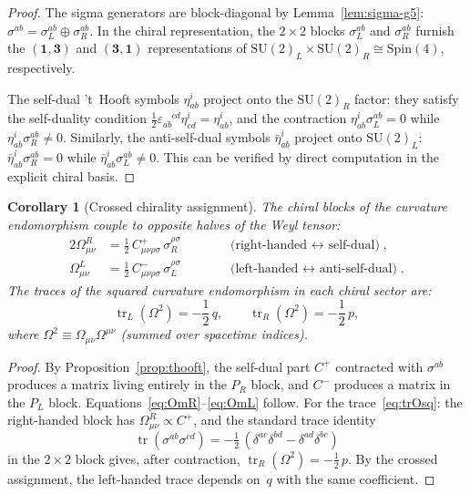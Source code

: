 \documentclass[12pt,a4paper]{article}
\newtheorem{corollary}[theorem]{Corollary}
\theoremstyle{definition}
\theoremstyle{remark}
\newcommand{\tr}{\operatorname{tr}}
\newcommand{\half}{\tfrac{1}{2}}
\begin{document}
\begin{proof}
The sigma generators are block-diagonal by Lemma~\ref{lem:sigma-g5}:
$\sigma^{ab} = \sigma^{ab}_L \oplus \sigma^{ab}_R$.  In the chiral
representation, the $2 \times 2$ blocks $\sigma^{ab}_L$ and $\sigma^{ab}_R$
furnish the $(\mathbf{1}, \mathbf{3})$ and $(\mathbf{3}, \mathbf{1})$
representations of $\mathrm{SU}(2)_L \times \mathrm{SU}(2)_R \cong
\mathrm{Spin}(4)$, respectively.

The self-dual 't~Hooft symbols $\eta^i_{ab}$ project onto the
$\mathrm{SU}(2)_R$ factor: they satisfy the self-duality condition
$\frac{1}{2}\varepsilon_{ab}^{\phantom{ab}cd}\eta^i_{cd} = \eta^i_{ab}$,
and the contraction $\eta^i_{ab}\sigma^{ab}_L = 0$ while
$\eta^i_{ab}\sigma^{ab}_R \neq 0$.  Similarly, the anti-self-dual
symbols $\bar\eta^i_{ab}$ project onto $\mathrm{SU}(2)_L$:
$\bar\eta^i_{ab}\sigma^{ab}_R = 0$ while
$\bar\eta^i_{ab}\sigma^{ab}_L \neq 0$.
This can be verified by direct computation in the explicit chiral basis.
\end{proof}

\begin{corollary}[Crossed chirality assignment]
\label{cor:crossed}
The chiral blocks of the curvature endomorphism couple to opposite halves
of the Weyl tensor:
\begin{alignat}{2}
  \Omega^R_{\mu\nu} &= \frac{1}{2}\,C^+_{\mu\nu\rho\sigma}\,
  \sigma^{\rho\sigma}_R
  &\qquad &\text{(right-handed $\leftrightarrow$ self-dual)},
  \label{eq:OmR} \\[4pt]
  \Omega^L_{\mu\nu} &= \frac{1}{2}\,C^-_{\mu\nu\rho\sigma}\,
  \sigma^{\rho\sigma}_L
  &\qquad &\text{(left-handed $\leftrightarrow$ anti-self-dual)}.
  \label{eq:OmL}
\end{alignat}
The traces of the squared curvature endomorphism in each chiral sector are:
\begin{equation}\label{eq:trOsq}
  \tr_L(\Omega^2) = -\frac{1}{2}\,q, \qquad
  \tr_R(\Omega^2) = -\frac{1}{2}\,p,
\end{equation}
where $\Omega^2 \equiv \Omega_{\mu\nu}\Omega^{\mu\nu}$ (summed over
spacetime indices).
\end{corollary}

\begin{proof}
By Proposition~\ref{prop:thooft}, the self-dual part $C^+$ contracted
with $\sigma^{ab}$ produces a matrix living entirely in the $P_R$ block,
and $C^-$ produces a matrix in the $P_L$ block.
Equations~\eqref{eq:OmR}--\eqref{eq:OmL} follow.  For the
trace~\eqref{eq:trOsq}: the right-handed block has
$\Omega^R_{\mu\nu} \propto C^+$, and the standard trace identity
\begin{equation}
  \tr(\sigma^{ab}\sigma^{cd})
  = -\half\,(\delta^{ac}\delta^{bd} - \delta^{ad}\delta^{bc})
\end{equation}
in the $2 \times 2$ block gives, after
contraction, $\tr_R(\Omega^2) = -\half\,p$.  By the crossed
assignment, the left-handed trace depends on~$q$ with the same
coefficient.
\end{proof}
\end{document}
